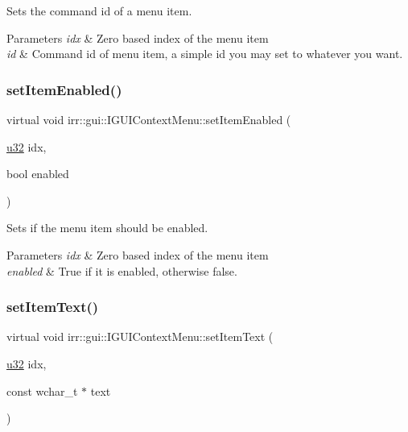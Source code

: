 Sets the command id of a menu item. 


\begin{DoxyParams}{Parameters}
{\em idx} & Zero based index of the menu item \\
\hline
{\em id} & Command id of menu item, a simple id you may set to whatever you want. \\
\hline
\end{DoxyParams}
\mbox{\label{classirr_1_1gui_1_1IGUIContextMenu_aa3c36d6cd990f3b488be2c7f419b89ee}} 
\subsubsection{\texorpdfstring{set\+Item\+Enabled()}{setItemEnabled()}}
{\footnotesize\ttfamily virtual void irr\+::gui\+::\+I\+G\+U\+I\+Context\+Menu\+::set\+Item\+Enabled (\begin{DoxyParamCaption}\item[{\hyperlink{namespaceirr_a0416a53257075833e7002efd0a18e804}{u32}}]{idx,  }\item[{bool}]{enabled }\end{DoxyParamCaption})\hspace{0.3cm}{\ttfamily [pure virtual]}}



Sets if the menu item should be enabled. 


\begin{DoxyParams}{Parameters}
{\em idx} & Zero based index of the menu item \\
\hline
{\em enabled} & True if it is enabled, otherwise false. \\
\hline
\end{DoxyParams}
\mbox{\label{classirr_1_1gui_1_1IGUIContextMenu_a20d0e53213a2915a8a62c54b5aa2ff08}} 
\subsubsection{\texorpdfstring{set\+Item\+Text()}{setItemText()}}
{\footnotesize\ttfamily virtual void irr\+::gui\+::\+I\+G\+U\+I\+Context\+Menu\+::set\+Item\+Text (\begin{DoxyParamCaption}\item[{\hyperlink{namespaceirr_a0416a53257075833e7002efd0a18e804}{u32}}]{idx,  }\item[{const wchar\+\_\+t $\ast$}]{text }\end{DoxyParamCaption})\hspace{0.3cm}{\ttfamily [pure virtual]}}



